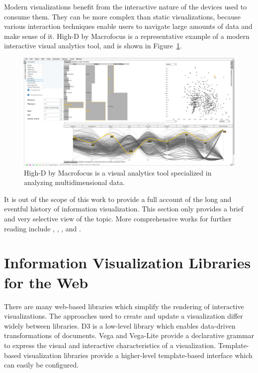 Modern visualizations benefit from the interactive nature of the
devices used to consume them. They can be more complex than static
visualizations, because various interaction techniques enable users to
navigate large amounts of data and make sense of it. High-D by
Macrofocus \parencite{HighD} is a representative example of a modern
interactive visual analytics tool, and is shown in
Figure~\ref{fig:HighD}.

\begin{figure}[tp]
\centering
\includegraphics[keepaspectratio,width=\linewidth,height=\thirdh]
{images/high-d.png}
\caption[High-D]{
High-D by Macrofocus is a visual analytics tool
specialized in analyzing multidimensional data.
}
\label{fig:HighD}
\end{figure}




It is out of the scope of this work to provide a full account of the
long and eventful history of information visualization. This section
only provides a brief and very selective view of the topic.  More
comprehensive works for further reading include
\textcite{BriefHistoryOfDataVis}, \textcite{Meirelles-2013},
\textcite{HistoryOfInformationGraphics}, and
\textcite{HistoryOfDataVisAndGraphicCommunication}.










\section{Information Visualization Libraries for the Web}

There are many web-based libraries which simplify the rendering of
interactive visualizations. The approaches used to create and update a
visualization differ widely between libraries. D3 is a low-level
library which enables data-driven transformations of documents. Vega
and Vega-Lite provide a declarative grammar to express the visual and
interactive characteristics of a visualization. Template-based
visualization libraries provide a higher-level template-based
interface which can easily be configured.



